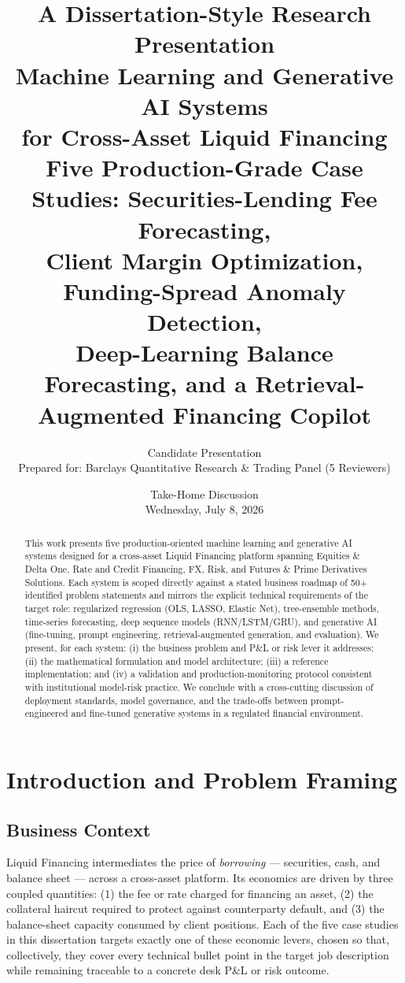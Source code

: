 \documentclass[11pt]{report}
\title{
  \vspace{-1.5cm}
  {\Large\color{steel}A Dissertation-Style Research Presentation}\\[0.4cm]
  {\huge\bfseries\color{navy} Machine Learning and Generative AI Systems\\ for Cross-Asset Liquid Financing}\\[0.6cm]
  {\large\color{steel}Five Production-Grade Case Studies: Securities-Lending Fee Forecasting,\\
  Client Margin Optimization, Funding-Spread Anomaly Detection,\\
  Deep-Learning Balance Forecasting, and a Retrieval-Augmented Financing Copilot}
}
\author{Candidate Presentation \\ \small Prepared for: Barclays Quantitative Research \& Trading Panel (5 Reviewers)}
\date{Take-Home Discussion \\ Wednesday, July 8, 2026}
\begin{document}
\maketitle
\thispagestyle{empty}

\begin{abstract}
\noindent This work presents five production-oriented machine learning and generative AI systems
designed for a cross-asset Liquid Financing platform spanning Equities \& Delta One, Rate and Credit
Financing, FX, Risk, and Futures \& Prime Derivatives Solutions. Each system is scoped directly against
a stated business roadmap of 50+ identified problem statements and mirrors the explicit technical
requirements of the target role: regularized regression (OLS, LASSO, Elastic Net), tree-ensemble
methods, time-series forecasting, deep sequence models (RNN/LSTM/GRU), and generative AI
(fine-tuning, prompt engineering, retrieval-augmented generation, and evaluation). We present, for
each system: (i) the business problem and P\&L or risk lever it addresses; (ii) the mathematical
formulation and model architecture; (iii) a reference implementation; and (iv) a validation and
production-monitoring protocol consistent with institutional model-risk practice. We conclude with a
cross-cutting discussion of deployment standards, model governance, and the trade-offs between
prompt-engineered and fine-tuned generative systems in a regulated financial environment.
\end{abstract}

\tableofcontents

\chapter{Introduction and Problem Framing}

\section{Business Context}
Liquid Financing intermediates the price of \emph{borrowing} — securities, cash, and balance sheet —
across a cross-asset platform. Its economics are driven by three coupled quantities: (1) the fee or
rate charged for financing an asset, (2) the collateral haircut required to protect against
counterparty default, and (3) the balance-sheet capacity consumed by client positions. Each of the
five case studies in this dissertation targets exactly one of these economic levers, chosen so that,
collectively, they cover every technical bullet point in the target job description while remaining
traceable to a concrete desk P\&L or risk outcome.
\end{document}
